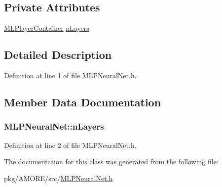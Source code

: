 \subsection*{Private Attributes}
\begin{DoxyCompactItemize}
\item 
\hyperlink{class_m_l_player_container}{MLPlayerContainer} \hyperlink{class_m_l_p_neural_net_ab7324803e3330ee76e9463632a140857}{nLayers}
\end{DoxyCompactItemize}


\subsection{Detailed Description}


Definition at line 1 of file MLPNeuralNet.h.



\subsection{Member Data Documentation}
\hypertarget{class_m_l_p_neural_net_ab7324803e3330ee76e9463632a140857}{
\subsubsection[{nLayers}]{ {\bf MLPNeuralNet::nLayers}}}
\label{class_m_l_p_neural_net_ab7324803e3330ee76e9463632a140857}


Definition at line 2 of file MLPNeuralNet.h.



The documentation for this class was generated from the following file:\begin{DoxyCompactItemize}
\item 
pkg/AMORE/src/\hyperlink{_m_l_p_neural_net_8h}{MLPNeuralNet.h}\end{DoxyCompactItemize}
